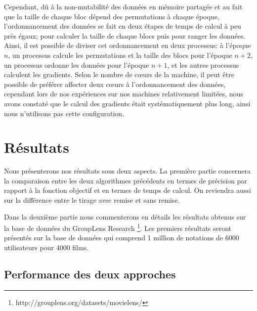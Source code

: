 \documentclass[10pt,a4paper]{article}
\begin{document}
Cependant, dû à la non-mutabilité des données en mémoire partagée et au fait que la taille de chaque bloc dépend des permutations à chaque époque, l'ordonnancement des données se fait en deux étapes de temps de calcul à peu près égaux; pour calculer la taille de chaque blocs puis pour ranger les données. Ainsi, il est possible de diviser cet ordonnancement en deux processus: à l'époque $n$, un processus calcule les permutations et la taille des blocs pour l'époque $n+2$, un processus ordonne les données pour l'époque $n+1$, et les autres processus calculent les gradients. Selon le nombre de cœurs de la machine, il peut être possible de préférer affecter deux cœurs à l'ordonnancement des données, cependant lors de nos expériences sur nos machines relativement limitées, nous avons constaté que le calcul des gradients était systématiquement plus long, ainsi nous n'utilisons pas cette configuration.

\section{Résultats}

Nous présenterons nos résultats sous deux aspects. La première partie concernera la comparaison entre les deux algorithmes précédents en termes de précision par rapport à la fonction objectif et en termes de temps de calcul. On reviendra aussi sur la différence entre le tirage avec remise et sans remise.

 Dans la deuxième partie nous commenterons en détails les résultats obtenus sur la base de données du GroupLens Research \footnote{http://grouplens.org/datasets/movielens/}. Les premiers résultats seront présentés sur la base de données qui comprend 1 million de notations de 6000 utilisateurs pour 4000 films. 

\subsection{Performance des deux approches}
\end{document}
